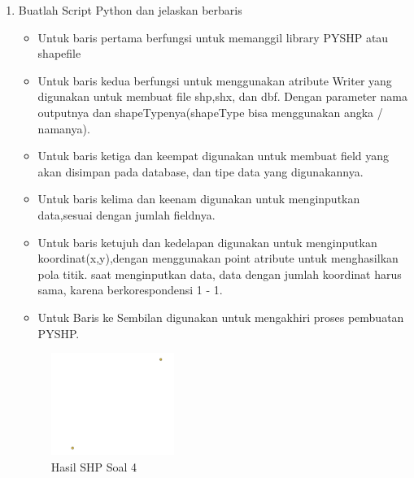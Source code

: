 \begin{enumerate}
	\item Buatlah Script Python dan jelaskan berbaris
	
	\begin{itemize}
		\item Untuk baris pertama berfungsi untuk memanggil library PYSHP atau shapefile
		\item Untuk baris kedua berfungsi untuk menggunakan atribute Writer yang digunakan untuk membuat file shp,shx, dan dbf. \hfill\break Dengan parameter nama outputnya dan shapeTypenya(shapeType bisa menggunakan angka / namanya).
		\item Untuk baris ketiga dan keempat digunakan untuk membuat field yang akan disimpan pada database, dan tipe data yang digunakannya.
		\item Untuk baris kelima dan keenam digunakan untuk menginputkan data,sesuai dengan jumlah fieldnya.
		\item Untuk baris ketujuh dan kedelapan digunakan untuk menginputkan koordinat(x,y),dengan menggunakan point atribute untuk menghasilkan pola titik. \hfill\break
		saat menginputkan data, data dengan jumlah koordinat harus sama, karena berkorespondensi 1 - 1.
		\item Untuk Baris ke Sembilan digunakan untuk mengakhiri proses pembuatan PYSHP.
	\end{itemize}
	\hfill\break
	\begin{figure}[H]
		\includegraphics[width=4cm]{figures/1174002/2/4.png}
		\centering
		\caption{Hasil SHP Soal 4}
	\end{figure}


\end{enumerate}
